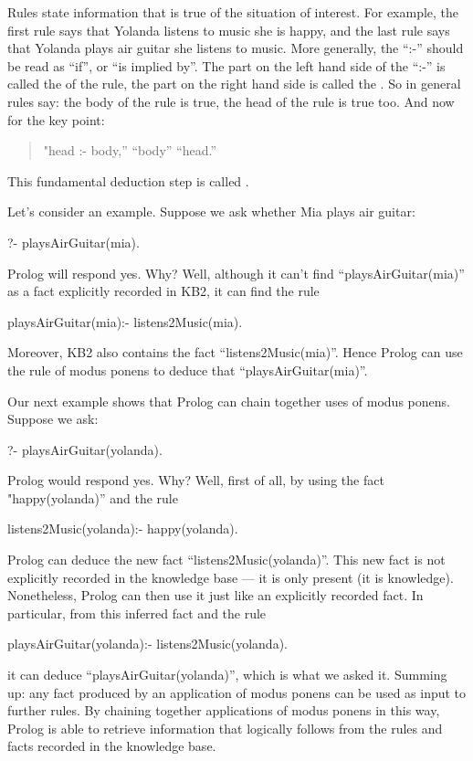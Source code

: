 Rules state information that is  true of the
situation of interest.  For example, the first rule says that Yolanda
listens to music  she is happy, and the last rule says
that Yolanda plays air guitar  she listens to music. More
generally, the ``:-'' should be read as ``if'', or ``is implied by''.
The part on the left hand side of the ``:-'' is called the 
of the rule, the part on the right hand side is called the
. So in general rules say:  the body of the
rule is true,  the head of the rule is true too.  And
now for the key point:
\begin{quote}
"head :- body,''  ``body''
 ``head.''
\end{quote}
This fundamental deduction step is
called .

Let's consider an example. Suppose we ask whether Mia plays air
guitar:
\begin{LPNcodedisplay}
?- playsAirGuitar(mia).
\end{LPNcodedisplay}
Prolog will respond yes. Why?  Well, although it can't find
``playsAirGuitar(mia)'' as a fact explicitly recorded in KB2, it can find the
rule
\begin{LPNcodedisplay}
playsAirGuitar(mia):- listens2Music(mia).
\end{LPNcodedisplay}
Moreover, KB2 also contains the fact ``listens2Music(mia)''.  Hence
Prolog can use the rule of modus ponens to deduce that
``playsAirGuitar(mia)''.

Our next example shows that Prolog can chain together uses of modus
ponens. Suppose we ask:
\begin{LPNcodedisplay}
?- playsAirGuitar(yolanda).
\end{LPNcodedisplay}
Prolog would respond yes.  Why? Well, first of all, by using the fact
"happy(yolanda)'' and the rule
\begin{LPNcodedisplay}
listens2Music(yolanda):- happy(yolanda).
\end{LPNcodedisplay}
Prolog can deduce the new fact ``listens2Music(yolanda)''.  This new
fact is not explicitly recorded in the knowledge base --- it is only
 present (it is  knowledge).
Nonetheless, Prolog can then use it just like an explicitly recorded
fact. In particular, from this inferred fact and the rule
\begin{LPNcodedisplay}
playsAirGuitar(yolanda):- listens2Music(yolanda).
\end{LPNcodedisplay}
it can deduce ``playsAirGuitar(yolanda)'', which is what we asked it.
Summing up: any fact produced by an application of modus ponens can be used as
input to further rules. By chaining together applications of modus ponens in
this way, Prolog is able to retrieve information that logically follows from
the rules and facts recorded in the knowledge base.

